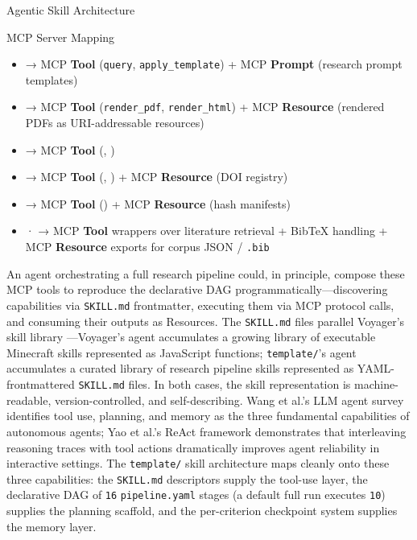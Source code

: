 \documentclass[
  ignorenonframetext,
]{beamer}
\providecommand{\tightlist}{%
  \setlength{\itemsep}{0pt}\setlength{\parskip}{0pt}}
\begin{document}
\begin{frame}{Agentic Skill Architecture}
\begin{block}{MCP Server Mapping}
\begin{itemize}
\tightlist
\item
   → MCP \textbf{Tool} (\texttt{query},
  \texttt{apply\_template}) + MCP \textbf{Prompt} (research prompt
  templates)
\item
   → MCP \textbf{Tool}
  (\texttt{render\_pdf}, \texttt{render\_html}) + MCP \textbf{Resource}
  (rendered PDFs as URI-addressable resources)
\item
   → MCP \textbf{Tool}
  (, )
\item
   → MCP \textbf{Tool}
  (, ) +
  MCP \textbf{Resource} (DOI registry)
\item
   → MCP \textbf{Tool}
  () + MCP \textbf{Resource}
  (hash manifests)
\item
   ·  →
  MCP \textbf{Tool} wrappers over literature retrieval + BibTeX handling
  + MCP \textbf{Resource} exports for corpus JSON / \texttt{.bib}
\end{itemize}

An agent orchestrating a full research pipeline could, in principle,
compose these MCP tools to reproduce the declarative DAG
programmatically---discovering capabilities via \texttt{SKILL.md}
frontmatter, executing them via MCP protocol calls, and consuming their
outputs as Resources. The \texttt{SKILL.md} files parallel Voyager's
skill library ---Voyager's agent accumulates a
growing library of executable Minecraft skills represented as JavaScript
functions; \texttt{template/}'s agent accumulates a curated library of
research pipeline skills represented as YAML-frontmattered
\texttt{SKILL.md} files. In both cases, the skill representation is
machine-readable, version-controlled, and self-describing. Wang et al.'s
LLM agent survey  identifies tool use, planning,
and memory as the three fundamental capabilities of autonomous agents;
Yao et al.'s ReAct framework  demonstrates that
interleaving reasoning traces with tool actions dramatically improves
agent reliability in interactive settings. The \texttt{template/} skill
architecture maps cleanly onto these three capabilities: the
\texttt{SKILL.md} descriptors supply the tool-use layer, the declarative
DAG of \texttt{16} \texttt{pipeline.yaml} stages (a default full run
executes \texttt{10}) supplies the planning scaffold, and the
per-criterion checkpoint system supplies the memory layer.
\end{block}
\end{frame}
\end{document}
